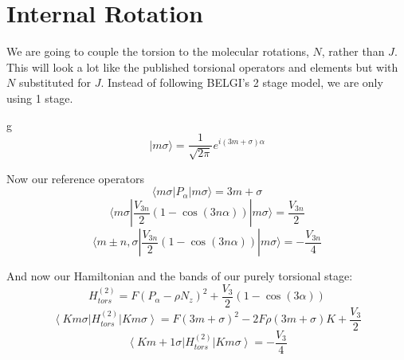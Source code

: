 \documentclass{article}
\begin{document}
\section{Internal Rotation}
We are going to couple the torsion to the molecular rotations, $N$, rather than $J$. This will look a lot like the published torsional operators and elements but with $N$ substituted for $J$. Instead of following BELGI's 2 stage model, we are only using 1 stage.

g\begin{equation}
|m\sigma\rangle = \frac{1}{\sqrt{2\pi}}e^{i(3m+\sigma)\alpha}
\end{equation}

Now our reference operators
\begin{equation}
\langle m \sigma |P_{\alpha}|m\sigma\rangle = 3m+\sigma
\end{equation}
\begin{equation}
\langle m \sigma |\frac{V_{3n}}{2}(1-\cos (3n\alpha))| m\sigma\rangle = \frac{V_{3n}}{2}
\end{equation}
\begin{equation}
\langle m\pm n, \sigma | \frac{V_{3n}}{2}(1-\cos (3n\alpha))| m\sigma\rangle = -\frac{V_{3n}}{4}
\end{equation}

And now our Hamiltonian and the bands of our purely torsional stage:
\begin{equation}
H_{tors}^{(2)} = F(P_{\alpha}-\rho N_{z})^{2} + \frac{V_{3}}{2}(1-\cos (3\alpha))
\end{equation}
\begin{equation}
\left\langle K m\sigma\right|H_{tors}^{(2)}\left|K m\sigma\right\rangle = F(3m+\sigma)^{2} - 2F\rho(3m+\sigma)K +\frac{V_{3}}{2}
\end{equation}
\begin{equation}
\left\langle K m+1\sigma\right|H_{tors}^{(2)}\left|K m\sigma\right\rangle = -\frac{V_{3}}{4}
\end{equation}
\end{document}
